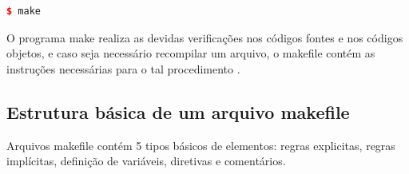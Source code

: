 \begin{lstlisting}[language=C++,caption={
                             Chamada de sistema para executar o programa make},
				                                                label=codigo_20]
    $ make
\end{lstlisting}


O programa make realiza as devidas verificações nos códigos fontes e
 nos códigos objetos, e caso seja necessário recompilar um arquivo, o
 makefile contém as instruções necessárias para o tal procedimento
 \cite[pag.1]{ref45}.


\subsection{Estrutura básica de um arquivo makefile}

Arquivos makefile contém 5 tipos básicos de elementos: regras explicitas,
 regras implícitas, definição de variáveis, diretivas e comentários.

